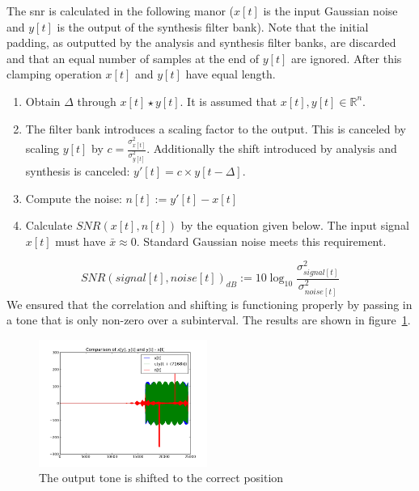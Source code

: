 \documentclass[a4paper,10pt]{article}
\begin{document}
The \gls{snr} is calculated in the following manor ($x[t]$ is the input Gaussian noise and $y[t]$ is the output of the synthesis filter bank). Note that
the initial padding, as outputted by the analysis and synthesis filter banks, are discarded and that an equal number of samples at the end of $y[t]$ are ignored. After this
clamping operation $x[t]$ and $y[t]$ have equal length.
\begin{enumerate}
 \item Obtain $\Delta$ through $x[t]\star y[t]$. It is assumed that $x[t],y[t]\in\mathbb{R}^n$.
 \item The filter bank introduces a scaling factor to the output. This is canceled by scaling $y[t]$ by $c = \frac{\sigma_{x[t]}^2}{\sigma_{y[t]}^2}$. Additionally the shift 
 introduced by analysis and synthesis is canceled: $y'[t] = c\times y[t-\Delta]$.
 \item Compute the noise: $n[t] := y'[t]-x[t]$
 \item Calculate $SNR(x[t],n[t])$ by the equation given below. The input signal $x[t]$ must have $\bar x\approx 0$. Standard Gaussian noise meets this requirement.
\end{enumerate}
\begin{equation}
 SNR(signal[t],noise[t])_{dB}:=10\log_{10}{\frac{\sigma_{signal[t]}^2}{\sigma_{noise[t]}^2}}
\end{equation}
We ensured that the correlation and shifting is functioning properly by passing in a tone that is only non-zero over a subinterval. The results are shown in figure~\ref{shift_test}.
\begin{figure}[ht!]
  \centering
  \includegraphics[width=0.49\textwidth]{shift_test.png}
  \caption[Validation of inverse shift for the calculation of the \gls{snr}]{The output tone is shifted to the correct position}
  \label{shift_test}
\end{figure}
\end{document}
